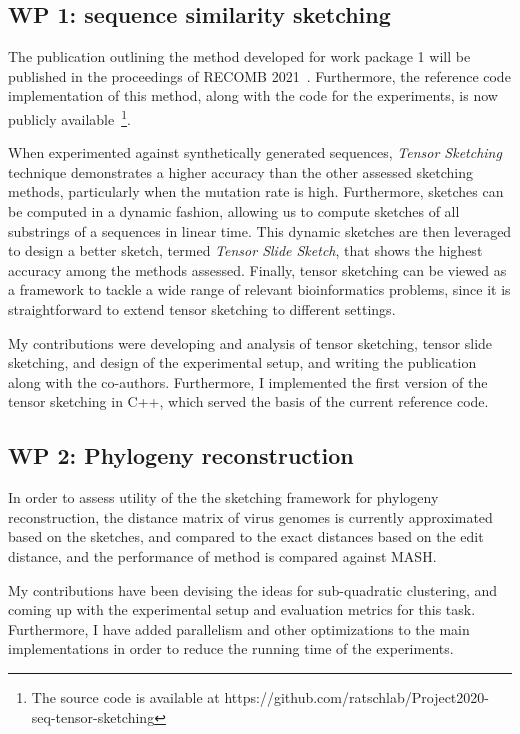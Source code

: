 

\subsection{WP 1: sequence similarity sketching}
The publication outlining the method developed for work package 1 will be published in the proceedings of RECOMB 2021~\cite{joudaki2020fast}. Furthermore, the reference code implementation of this method, along with the code for the experiments, is now publicly available~\footnote{The source code is available at https://github.com/ratschlab/Project2020-seq-tensor-sketching}. 

When experimented against synthetically generated sequences, \emph{Tensor Sketching} technique demonstrates a higher accuracy than the other assessed sketching methods, particularly when the mutation rate is high. Furthermore, sketches can be computed in a dynamic fashion, allowing us to compute sketches of all substrings of a sequences in linear time. This dynamic sketches are then leveraged to design a better sketch, termed \emph{Tensor Slide Sketch}, that shows the highest accuracy among the methods assessed. Finally, tensor sketching can be viewed as a framework to tackle a wide range of relevant bioinformatics problems, since it is straightforward to extend tensor sketching to different settings.

My contributions were developing and analysis of tensor sketching, tensor slide sketching, and design of the experimental setup, and writing the publication along with the co-authors. Furthermore, I implemented the first version of the tensor sketching in C++, which served the basis of the current reference code.


\subsection{WP 2: Phylogeny reconstruction}
In order to assess utility of the the sketching framework for phylogeny reconstruction, the distance matrix of virus genomes is currently approximated based on the sketches, and compared to the exact distances based on the edit distance, and the performance of method is compared against MASH. 

My contributions have been devising the ideas for sub-quadratic clustering, and coming up with the experimental setup and evaluation metrics for this task. Furthermore, I have added parallelism and other optimizations to the main implementations in order to reduce the running time of the experiments. 
